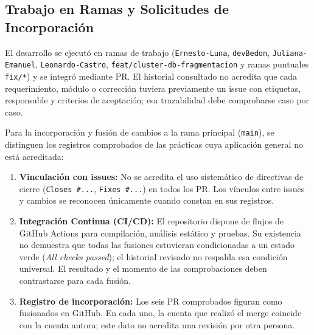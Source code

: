 \documentclass[11pt,a4paper]{article}
\begin{document}
\subsection{Trabajo en Ramas y Solicitudes de Incorporación}
El desarrollo se ejecutó en ramas de trabajo (\texttt{Ernesto-Luna}, \texttt{devBedon}, \texttt{Juliana-Emanuel}, \texttt{Leonardo-Castro}, \texttt{feat/cluster-db-fragmentacion} y ramas puntuales \texttt{fix/*}) y se integró mediante PR. El historial consultado no acredita que cada requerimiento, módulo o corrección tuviera previamente un issue con etiquetas, responsable y criterios de aceptación; esa trazabilidad debe comprobarse caso por caso.

Para la incorporación y fusión de cambios a la rama principal (\texttt{main}), se distinguen los registros comprobados de las prácticas cuya aplicación general no está acreditada:
\begin{enumerate}[leftmargin=*]
  \item \textbf{Vinculación con issues:} No se acredita el uso sistemático de directivas de cierre (\texttt{Closes \#...}, \texttt{Fixes \#...}) en todos los PR. Los vínculos entre issues y cambios se reconocen únicamente cuando constan en sus registros.
  \item \textbf{Integración Continua (CI/CD):} El repositorio dispone de flujos de GitHub Actions para compilación, análisis estático y pruebas. Su existencia no demuestra que todas las fusiones estuvieran condicionadas a un estado verde (\textit{All checks passed}); el historial revisado no respalda esa condición universal. El resultado y el momento de las comprobaciones deben contrastarse para cada fusión.
  \item \textbf{Registro de incorporación:} Los seis PR comprobados figuran como fusionados en GitHub. En cada uno, la cuenta que realizó el merge coincide con la cuenta autora; este dato no acredita una revisión por otra persona.
\end{enumerate}
\end{document}
